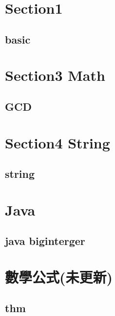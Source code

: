 \section{Section1}
    \subsection{basic}
        
        
\section{Section3 Math}
    \subsection{GCD}
            

\section{Section4 String}
    \subsection{string}
        

\section{Java}
    \subsection{java biginterger}
        


\section{數學公式(未更新)}
    \subsection{thm}
        
        
